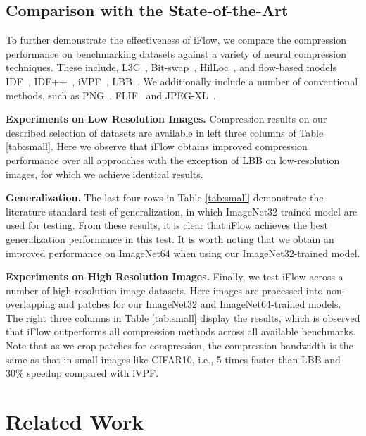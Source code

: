 \documentclass{article}
\begin{document}
\subsection{Comparison with the State-of-the-Art}
To further demonstrate the effectiveness of iFlow, we compare the compression performance on benchmarking datasets against a variety of neural compression techniques. These include, L3C~\cite{mentzer2019practical}, Bit-swap~\cite{kingma2019bit}, HilLoc~\cite{townsend2019hilloc}, and flow-based models IDF~\cite{hoogeboom2019integer}, IDF++~\cite{berg2020idf++}, iVPF~\cite{zhang2021ivpf}, LBB~\cite{ho2019compression}. We additionally include a number of conventional methods, such as PNG~\cite{boutell1997png}, FLIF~\cite{sneyers2016flif} and JPEG-XL~\cite{alakuijala2019jpeg}.

\textbf{Experiments on Low Resolution Images.}
Compression results on our described selection of datasets are available in left three columns of Table \ref{tab:small}. 
Here we observe that iFlow obtains improved compression performance over all approaches with the exception of LBB on low-resolution images, for which we achieve identical results.

\textbf{Generalization.}
The last four rows in Table \ref{tab:small} demonstrate the literature-standard test of generalization, in which ImageNet32 trained model are used for testing. From these results, it is clear that iFlow achieves the best generalization performance in this test. It is worth noting that we obtain an improved performance on ImageNet64 when using our ImageNet32-trained model.

\textbf{Experiments on High Resolution Images.}
Finally, we test iFlow across a number of high-resolution image datasets. Here images are processed into non-overlapping  and  patches for our ImageNet32 and ImageNet64-trained models. The right three columns in Table \ref{tab:small} display the results, which is observed that iFlow outperforms all compression methods across all available benchmarks. 
Note that as we crop patches for compression, the compression bandwidth is the same as that in small images like CIFAR10, i.e., 5 times faster than LBB and 30\% speedup compared with iVPF.


\vspace{-3pt}
\section{Related Work}
\vspace{-3pt}
\end{document}
